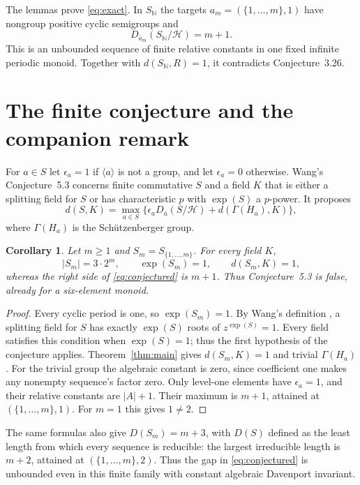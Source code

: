 \documentclass[11pt]{article}
\newtheorem{corollary}[theorem]{Corollary}
\newcommand{\HH}{\mathcal H}
\begin{document}
The lemmas prove \eqref{eq:exact}. In $S_{\mathbb N}$ the targets
$a_m=(\{1,\ldots,m\},1)$ have nongroup positive cyclic semigroups and
\[
 D_{\bar a_m}(S_{\mathbb N}/\HH)=m+1.
\]
This is an unbounded sequence of finite relative constants in one fixed
infinite periodic monoid. Together with $d(S_{\mathbb N},R)=1$, it
contradicts Conjecture~3.26.

\section{The finite conjecture and the companion remark}

For $a\in S$ let $\epsilon_a=1$ if $\langle a\rangle$ is not a group,
and let $\epsilon_a=0$ otherwise. Wang's Conjecture~5.3 concerns finite
commutative $S$ and a field $K$ that is either a splitting field for $S$
or has characteristic $p$ with $\exp(S)$ a $p$-power. It proposes
\begin{equation}\label{eq:conjectured}
 d(S,K)=\max_{a\in S}
 \{\epsilon_aD_{\bar a}(S/\HH)+d(\Gamma(H_a),K)\},
\end{equation}
where $\Gamma(H_a)$ is the Sch\"utzenberger group.

\begin{corollary}\label{cor:finite}
Let $m\geq1$ and $S_m=S_{\{1,\ldots,m\}}$. For every field $K$,
\[
 |S_m|=3\cdot2^m,\qquad \exp(S_m)=1,\qquad d(S_m,K)=1,
\]
whereas the right side of \eqref{eq:conjectured} is $m+1$.
Thus Conjecture~5.3 is false, already for a six-element monoid.
\end{corollary}
\begin{proof}
Every cyclic period is one, so $\exp(S_m)=1$. By Wang's definition
\cite[p.~9]{Wang2025}, a splitting field for $S$ has exactly $\exp(S)$
roots of $z^{\exp(S)}=1$. Every field satisfies this condition when
$\exp(S)=1$; thus the first hypothesis of the conjecture applies.
Theorem~\ref{thm:main} gives $d(S_m,K)=1$ and trivial
$\Gamma(H_a)$. For the trivial group the algebraic constant is zero,
since coefficient one makes any nonempty sequence's factor zero.
Only level-one elements have $\epsilon_a=1$, and their relative
constants are $|A|+1$. Their maximum is $m+1$, attained at
$(\{1,\ldots,m\},1)$. For $m=1$ this gives $1\ne2$.
\end{proof}

The same formulas also give $D(S_m)=m+3$, with $D(S)$ defined as the
least length from which every sequence is reducible: the largest
irreducible length is $m+2$, attained at $(\{1,\ldots,m\},2)$.
Thus the gap in \eqref{eq:conjectured} is unbounded even in this finite
family with constant algebraic Davenport invariant.
\end{document}

